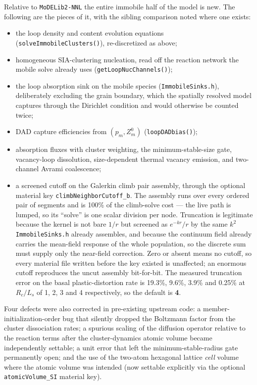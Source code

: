 \documentclass[11pt]{article}
\newcommand{\code}[1]{\texttt{\small #1}}
\newcommand{\file}[1]{\texttt{\footnotesize #1}}
\begin{document}
Relative to \file{MoDELib2-NNL} the entire immobile half of the model is new.
The following are the pieces of it, with the sibling comparison noted where one
exists:

\begin{itemize}
\item the loop density and content evolution equations
(\code{solveImmobileClusters()}), re-discretized as above;
\item homogeneous SIA-clustering nucleation, read off the reaction network
the mobile solve already uses (\code{getLoopNucChannels()});
\item the loop absorption sink on the mobile species
(\file{ImmobileSinks.h}), deliberately excluding the grain boundary, which
the spatially resolved model captures through the Dirichlet condition and
would otherwise be counted twice;
\item DAD capture efficiencies from $(p_m, Z^0_m)$ (\code{loopDADbias()});
\item absorption fluxes with cluster weighting, the minimum-stable-size
gate, vacancy-loop dissolution, size-dependent thermal vacancy emission, and
two-channel Avrami coalescence;
\item a screened cutoff on the Galerkin climb pair assembly, through the
optional material key \code{climbNeighborCutoff\_b}. The assembly runs over
every ordered pair of segments and is 100\% of the climb-solve cost --- the
live path is lumped, so its ``solve'' is one scalar division per node.
Truncation is legitimate because the kernel is not bare $1/r$ but screened as
$e^{-kr}/r$ by the same $k^2$ \file{ImmobileSinks.h} already assembles, and
because the continuum field already carries the mean-field response of the
whole population, so the discrete sum must supply only the near-field
correction. Zero or absent means no cutoff, so every material file written
before the key existed is unaffected; an enormous cutoff reproduces the uncut
assembly bit-for-bit. The measured truncation error on the basal
plastic-distortion rate is 19.3\%, 9.6\%, 3.9\% and 0.25\% at
$R_c/L_s$ of 1, 2, 3 and 4 respectively, so the default is \textbf{4}.
\end{itemize}

Four defects were also corrected in pre-existing upstream code: a
member-initialization-order bug that silently dropped the Boltzmann factor
from the cluster dissociation rates; a spurious scaling of the diffusion
operator relative to the reaction terms after the cluster-dynamics atomic
volume became independently settable; a unit error that left the
minimum-stable-radius gate permanently open; and the use of the two-atom
hexagonal lattice \emph{cell} volume where the atomic volume was intended
(now settable explicitly via the optional \code{atomicVolume\_SI} material
key).
\end{document}
